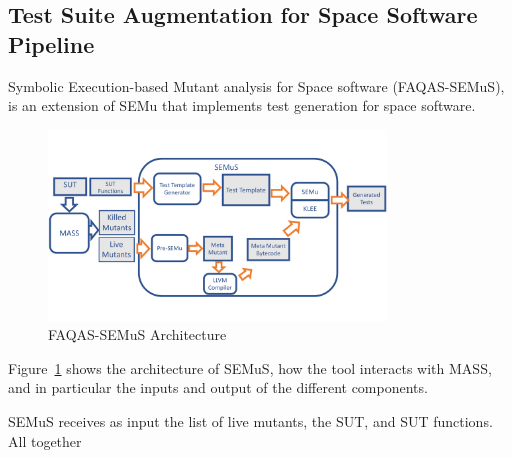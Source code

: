 
\newpage
\subsection{Test Suite Augmentation for Space Software Pipeline}
\label{sec:semus}

Symbolic Execution-based Mutant analysis for Space software (FAQAS-SEMuS), is an extension of SEMu that implements test generation for space software. 

\begin{figure}[tb]
\begin{center}
\includegraphics[width=0.8\textwidth]{images/semus-architecture}
\caption{FAQAS-SEMuS Architecture}
\label{fig:semus_architecture}
\end{center}
\end{figure}

Figure~\ref{fig:semus_architecture} shows the architecture of SEMuS, how the tool interacts with MASS, and in particular the inputs and output of the different components.



SEMuS receives as input the list of live mutants, the SUT, and SUT functions. All together  

